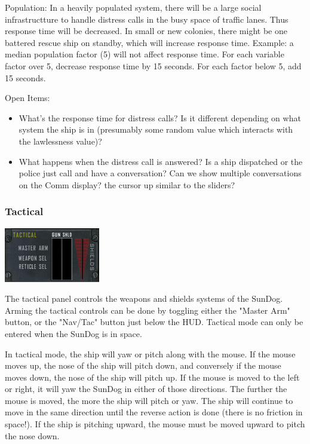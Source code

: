 Population: In a heavily populated system, there will be a large social infrastructture to handle distress calls in the busy space of traffic lanes. Thus response time will be decreased. In small or new colonies, there might be one battered rescue ship on standby, which will increase response time. Example: a median population factor (5) will not affect response time. For each variable factor over 5, decrease response time by 15 seconds. For each factor below 5, add 15 seconds. 

Open Items:
\begin{itemize}
\item What's the response time for distress calls?  Is it different
depending on what system the ship is in (presumably some random value
which interacts with the lawlessness value)?
\item What happens when the distress call is answered?  Is a ship dispatched or
the police just call and have a conversation?  Can we show multiple
conversations on the Comm display?
the cursor up similar to the sliders?
\end{itemize}

\subsubsection{Tactical}
\includegraphics[scale=0.7]{images/tactical.png}

The tactical panel controls the weapons and shields systems of the SunDog.
Arming the tactical controls can be done by toggling either the "Master Arm"
button, or the "Nav/Tac" button just below the HUD.  Tactical mode can
only be entered when the SunDog is in space.

In tactical mode, the ship will yaw or pitch along with the mouse.  If
the mouse moves up, the nose of the ship will pitch down, and conversely
if the mouse moves down, the nose of the ship will pitch up.  If the
mouse is moved to the left or right, it will yaw the SunDog in either
of those directions.  The further the mouse is moved, the more the ship
will pitch or yaw.  The ship will continue to move in the same direction until
the reverse action is done (there is no friction in space!).  If the
ship is pitching upward, the mouse must be moved upward to pitch the nose
down.

